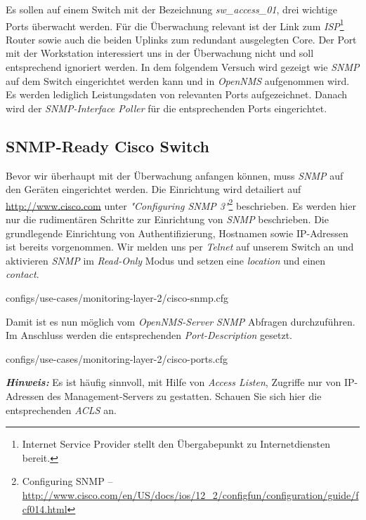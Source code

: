 Es sollen auf einem Switch mit der Bezeichnung \textit{sw\_access\_01}, drei wichtige Ports überwacht werden. Für die Überwachung relevant ist der Link zum \textit{ISP}\footnote{Internet Service Provider stellt den Übergabepunkt zu Internetdiensten bereit.} Router sowie auch die beiden Uplinks zum redundant ausgelegten Core. Der Port mit der Workstation interessiert uns in der Überwachung nicht und soll entsprechend ignoriert werden. In dem folgendem Versuch wird gezeigt wie \textit{SNMP} auf dem Switch eingerichtet werden kann und in \textit{OpenNMS} aufgenommen wird. Es werden lediglich Leistungsdaten von relevanten Ports aufgezeichnet. Danach wird der \textit{SNMP-Interface Poller} für die entsprechenden Ports eingerichtet.

\subsection{SNMP-Ready Cisco Switch}
Bevor wir überhaupt mit der Überwachung anfangen können, muss \textit{SNMP} auf den Geräten eingerichtet werden. Die Einrichtung wird detailiert auf \url{http://www.cisco.com} unter \textit{"Configuring SNMP 3"}\footnote{Configuring SNMP – \url{http://www.cisco.com/en/US/docs/ios/12_2/configfun/configuration/guide/fcf014.html}} beschrieben. Es werden hier nur die rudimentären Schritte zur Einrichtung von \textit{SNMP} beschrieben. Die grundlegende Einrichtung von Authentifizierung, Hostnamen sowie IP-Adressen ist bereits vorgenommen. Wir melden uns per \textit{Telnet} auf unserem Switch an und aktivieren \textit{SNMP} im \textit{Read-Only} Modus und setzen eine \textit{location} und einen \textit{contact}.


  {configs/use-cases/monitoring-layer-2/cisco-snmp.cfg}

Damit ist es nun möglich vom \textit{OpenNMS-Server} \textit{SNMP} Abfragen durchzuführen. Im Anschluss werden die entsprechenden \textit{Port-Description} gesetzt.


  {configs/use-cases/monitoring-layer-2/cisco-ports.cfg}

\textbf{\textit{Hinweis:}} Es ist häufig sinnvoll, mit Hilfe von \textit{Access Listen}, Zugriffe nur von IP-Adressen des Management-Servers zu gestatten. Schauen Sie sich hier die entsprechenden \textit{ACLS} an.

